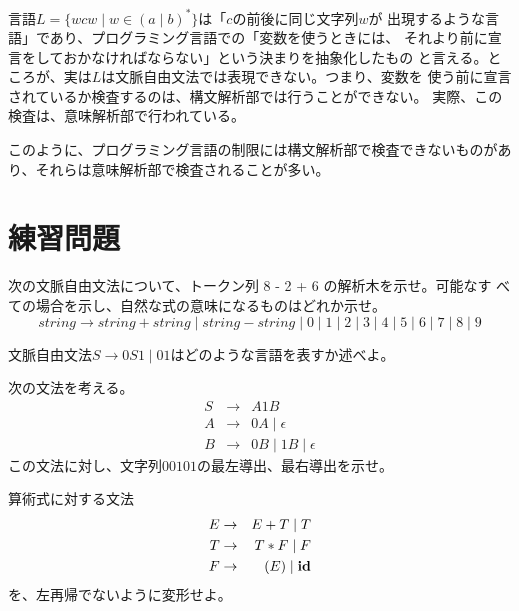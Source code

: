 言語$L = \{wcw \mid w \in (a \mid b)^* \}$は「$c$の前後に同じ文字列$w$が
出現するような言語」であり、プログラミング言語での「変数を使うときには、
それより前に宣言をしておかなければならない」という決まりを抽象化したもの
と言える。ところが、実は$L$は文脈自由文法では表現できない。つまり、変数を
使う前に宣言されているか検査するのは、構文解析部では行うことができない。
実際、この検査は、意味解析部で行われている。

このように、プログラミング言語の制限には構文解析部で検査できないものがあ
り、それらは意味解析部で検査されることが多い。

\section*{練習問題}

\begin{exercise}
 \label{ex:cfg_03}
 次の文脈自由文法について、トークン列 8 - 2 + 6 の解析木を示せ。可能なす
 べての場合を示し、自然な式の意味になるものはどれか示せ。
 \[
  string \rightarrow string + string \mid string - string \mid 0 \mid 1
 \mid 2 \mid 3 \mid 4 \mid 5 \mid 6 \mid 7 \mid 8 \mid 9
 \]
\end{exercise}
\begin{exercise}
 文脈自由文法$S \rightarrow 0 S 1 \mid 0 1$はどのような言語を表すか述べよ。
 \label{ex:cfg_04}
\end{exercise}
\begin{exercise}
 次の文法を考える。
  \begin{eqnarray*}
   S & \rightarrow & A1B \\
   A & \rightarrow & 0A \mid \epsilon \\
   B & \rightarrow & 0B \mid 1B \mid \epsilon
  \end{eqnarray*}
 この文法に対し、文字列$00101$の最左導出、最右導出を示せ。
 \label{ex:cfg_01}
\end{exercise}
\begin{exercise}
 算術式に対する文法
  \begin{eqnarray*}
   E & \rightarrow & E + T \mid T \\
   T & \rightarrow & T * F \mid F \\
   F & \rightarrow & (E) \mid {\bf id}
  \end{eqnarray*}
 を、左再帰でないように変形せよ。
 \label{ex:cfg_02}
\end{exercise}
